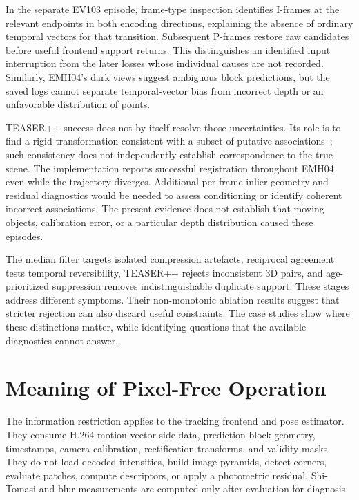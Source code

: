 In the separate EV103 episode, frame-type inspection identifies I-frames at the
relevant endpoints in both encoding directions, explaining the absence of ordinary
temporal vectors for that transition. Subsequent
P-frames restore raw candidates before useful frontend support returns. This
distinguishes an identified input interruption from the later losses whose
individual causes are not recorded. Similarly, EMH04's dark views suggest
ambiguous block predictions, but the saved logs cannot separate temporal-vector
bias from incorrect depth or an unfavorable distribution of points.

TEASER++ success does not by itself resolve those uncertainties. Its role is to
find a rigid transformation consistent with a subset of putative
associations~\cite{yang2020teaser}; such consistency does not independently
establish correspondence to the true scene. The implementation reports
successful registration throughout EMH04 even while the trajectory diverges.
Additional per-frame inlier geometry and residual diagnostics would be needed
to assess conditioning or identify coherent incorrect associations. The
present evidence does not establish that moving objects, calibration error,
or a particular depth distribution caused these episodes.

The median filter targets isolated compression artefacts, reciprocal agreement
tests temporal reversibility, TEASER++ rejects inconsistent 3D pairs, and
age-prioritized suppression removes indistinguishable duplicate support. These
stages address different symptoms. Their non-monotonic ablation results suggest
that stricter rejection can also discard useful constraints. The case studies
show where these distinctions matter, while identifying questions that the
available diagnostics cannot answer.

\section{Meaning of Pixel-Free Operation}

The information restriction applies to the tracking frontend and pose estimator. They
consume H.264 motion-vector side data, prediction-block geometry, timestamps,
camera calibration, rectification transforms, and validity masks. They do not
load decoded intensities, build image pyramids, detect corners, evaluate patches,
compute descriptors, or apply a photometric residual. Shi-Tomasi and blur
measurements are computed only after evaluation for diagnosis.

